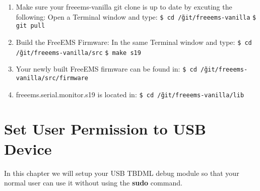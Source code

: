 \documentclass[12pt,notitlepage,onecolumn,oneside,openany]{memoir}
\begin{document}
\begin{enumerate}
\item \textsf{Make sure your freeems-vanilla git clone is up to date by excuting the following:} \newline
      \textsf{Open a Terminal window and type:} \newline
      \texttt{\$ cd \~/git/freeems-vanilla} \newline
      \texttt{\$ git pull}

\item \textsf{Build the FreeEMS Firmware:} \newline
      \textsf{In the same Terminal window and type:} \newline
      \texttt{\$ cd \~/git/freeems-vanilla/src} \newline
      \texttt{\$ make s19}

\item \textsf{Your newly built FreeEMS firmware can be found in:} \newline
      \texttt{\$ cd \~/git/freeems-vanilla/src/firmware}

\item \textsf{freeems.serial.monitor.s19 is located in:} \newline
      \texttt{\$ cd \~/git/freeems-vanilla/lib}
\end{enumerate}

\chapter{\textsf{Set User Permission to USB Device}}

\textsf{In this chapter we will setup your USB TBDML debug module so that your normal user can use it without using the \textbf{sudo} command.} \newline
\end{document}
